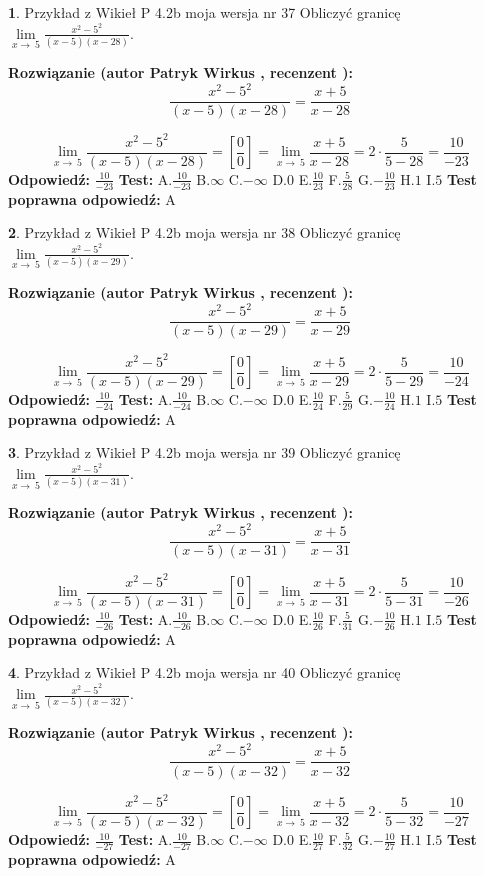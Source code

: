 \documentclass[12pt, a4paper]{article}
\theoremstyle{definition} %
\newtheorem{zad}{}
\newcommand{\zadStart}[1]{\begin{zad}#1\newline}
\newcommand{\zadStop}{\end{zad}}
\newcommand{\rozwStart}[2]{\noindent \textbf{Rozwiązanie (autor #1 , recenzent #2): }\newline}
\newcommand{\rozwStop}{\newline}
\newcommand{\odpStart}{\noindent \textbf{Odpowiedź:}\newline}
\newcommand{\odpStop}{\newline}
\newcommand{\testStart}{\noindent \textbf{Test:}\newline}
\newcommand{\testStop}{\newline}
\newcommand{\kluczStart}{\noindent \textbf{Test poprawna odpowiedź:}\newline}
\newcommand{\kluczStop}{\newline}
\begin{document}
\zadStart{Przykład z Wikieł P 4.2b moja wersja nr 37}
Obliczyć granicę $\lim\limits_{x\to\ 5}\frac{x^{2}-5^{2}}{(x-5)(x-28)}$.
\zadStop
\rozwStart{Patryk Wirkus}{}
$$\frac{x^{2}-5^{2}}{(x-5)(x-28)}=\frac{x+5}{x-28}$$

$$\lim\limits_{x\to\ 5}\frac{x^{2}-5^{2}}{(x-5)(x-28)}=[\frac{0}{0}]=\lim\limits_{x\to\ 5}\frac{x+5}{x-28}=2 \cdot \frac{5}{5-28} = \frac{10}{-23}$$
\rozwStop
\odpStart
$\frac{10}{-23}$
\odpStop
\testStart
A.$\frac{10}{-23}$
B.$\infty$
C.$-\infty$
D.$0$
E.$\frac{10}{23}$
F.$\frac{5}{28}$
G.$-\frac{10}{23}$
H.$1$
I.$5$
\testStop
\kluczStart
A
\kluczStop



\zadStart{Przykład z Wikieł P 4.2b moja wersja nr 38}
Obliczyć granicę $\lim\limits_{x\to\ 5}\frac{x^{2}-5^{2}}{(x-5)(x-29)}$.
\zadStop
\rozwStart{Patryk Wirkus}{}
$$\frac{x^{2}-5^{2}}{(x-5)(x-29)}=\frac{x+5}{x-29}$$

$$\lim\limits_{x\to\ 5}\frac{x^{2}-5^{2}}{(x-5)(x-29)}=[\frac{0}{0}]=\lim\limits_{x\to\ 5}\frac{x+5}{x-29}=2 \cdot \frac{5}{5-29} = \frac{10}{-24}$$
\rozwStop
\odpStart
$\frac{10}{-24}$
\odpStop
\testStart
A.$\frac{10}{-24}$
B.$\infty$
C.$-\infty$
D.$0$
E.$\frac{10}{24}$
F.$\frac{5}{29}$
G.$-\frac{10}{24}$
H.$1$
I.$5$
\testStop
\kluczStart
A
\kluczStop



\zadStart{Przykład z Wikieł P 4.2b moja wersja nr 39}
Obliczyć granicę $\lim\limits_{x\to\ 5}\frac{x^{2}-5^{2}}{(x-5)(x-31)}$.
\zadStop
\rozwStart{Patryk Wirkus}{}
$$\frac{x^{2}-5^{2}}{(x-5)(x-31)}=\frac{x+5}{x-31}$$

$$\lim\limits_{x\to\ 5}\frac{x^{2}-5^{2}}{(x-5)(x-31)}=[\frac{0}{0}]=\lim\limits_{x\to\ 5}\frac{x+5}{x-31}=2 \cdot \frac{5}{5-31} = \frac{10}{-26}$$
\rozwStop
\odpStart
$\frac{10}{-26}$
\odpStop
\testStart
A.$\frac{10}{-26}$
B.$\infty$
C.$-\infty$
D.$0$
E.$\frac{10}{26}$
F.$\frac{5}{31}$
G.$-\frac{10}{26}$
H.$1$
I.$5$
\testStop
\kluczStart
A
\kluczStop



\zadStart{Przykład z Wikieł P 4.2b moja wersja nr 40}
Obliczyć granicę $\lim\limits_{x\to\ 5}\frac{x^{2}-5^{2}}{(x-5)(x-32)}$.
\zadStop
\rozwStart{Patryk Wirkus}{}
$$\frac{x^{2}-5^{2}}{(x-5)(x-32)}=\frac{x+5}{x-32}$$

$$\lim\limits_{x\to\ 5}\frac{x^{2}-5^{2}}{(x-5)(x-32)}=[\frac{0}{0}]=\lim\limits_{x\to\ 5}\frac{x+5}{x-32}=2 \cdot \frac{5}{5-32} = \frac{10}{-27}$$
\rozwStop
\odpStart
$\frac{10}{-27}$
\odpStop
\testStart
A.$\frac{10}{-27}$
B.$\infty$
C.$-\infty$
D.$0$
E.$\frac{10}{27}$
F.$\frac{5}{32}$
G.$-\frac{10}{27}$
H.$1$
I.$5$
\testStop
\kluczStart
A
\kluczStop
\end{document}

